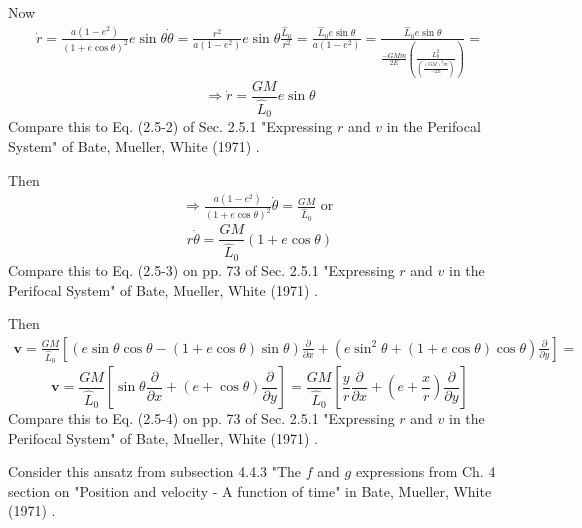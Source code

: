 Now
\[
\begin{gathered}
\dot{r} = \frac{ a ( 1 - e^2) }{ (1+ e\cos{\theta})^2 } e\sin{\theta} \dot{\theta} = \frac{r^2}{a (1-e^2) } e\sin{\theta} \frac{ \widehat{L}_0 }{ r^2} = \frac{ \widehat{L}_0 e\sin{\theta}}{ a(1-e^2)} = \frac{\widehat{L}_0 e\sin{\theta} }{ \frac{ -GMm}{2E} \left( \frac{ L_0^2}{ \left( \frac{(GM)^2 m }{ -2E} \right) } \right) } = 
\end{gathered}
\]
\begin{equation}
\Longrightarrow \dot{r} = \frac{GM}{\widehat{L}_0} e\sin{\theta}
\end{equation}
Compare this to Eq. (2.5-2) of Sec. 2.5.1 "Expressing $r$ and $v$ in the Perifocal System" of Bate, Mueller, White (1971) \cite{dgdt:BMW1971}.

Then
\[
\begin{gathered}
	\Longrightarrow \frac{ a (1-e^2) }{ (1 + e\cos{\theta})^2 } \dot{\theta} = \frac{GM}{ \widehat{L}_0 } \text{ or } 
\end{gathered}
\]
\begin{equation}
r\dot{\theta} = \frac{GM}{\widehat{L}_0 } (1 + e\cos{\theta})
\end{equation}
Compare this to Eq. (2.5-3) on pp. 73 of Sec. 2.5.1 "Expressing $r$ and $v$ in the Perifocal System" of Bate, Mueller, White (1971) \cite{dgdt:BMW1971}.

Then
\[
\begin{gathered}
\mathbf{v} = \frac{GM}{\widehat{L}_0} \left[ \left( e \sin{\theta} \cos{\theta} - (1 + e\cos{\theta}) \sin{\theta} \right) \frac{\partial }{ \partial x} + \left( e\sin^2{\theta} + (1 + e\cos{\theta} ) \cos{\theta} \right) \frac{\partial }{ \partial y} \right] = 
\end{gathered}
\]
\begin{equation}
\mathbf{v} = \frac{GM}{ \widehat{L}_0} \left[ \sin{\theta} \frac{\partial}{\partial x} + (e + \cos{\theta}) \frac{\partial }{\partial y} \right] = \frac{GM}{ \widehat{L}_0} \left[ \frac{y}{r} \frac{\partial}{\partial x} + (e + \frac{x}{r}) \frac{\partial }{\partial y} \right]
\end{equation}
Compare this to Eq. (2.5-4) on pp. 73 of Sec. 2.5.1 "Expressing $r$ and $v$ in the Perifocal System" of Bate, Mueller, White (1971) \cite{dgdt:BMW1971}.

Consider this ansatz from subsection 4.4.3 "The $f$ and $g$ expressions from Ch. 4 section on "Position and velocity - A function of time" in Bate, Mueller, White (1971) \cite{dgdt:BMW1971}. 

